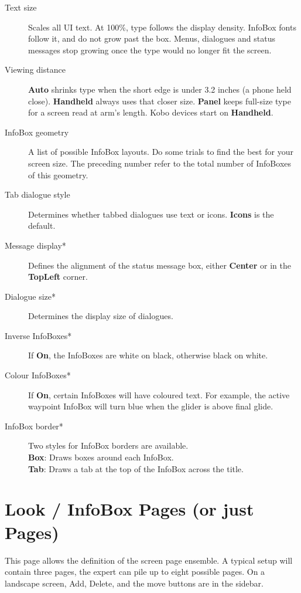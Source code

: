 \begin{description}
\item[Text size]  Scales all UI text. At 100\%, type follows the
  display density. InfoBox fonts follow it, and do not grow past
  the box. Menus, dialogues and status messages stop growing once
  the type would no longer fit the screen.
\item[Viewing distance]  {\bf Auto} shrinks type when the short edge
  is under 3.2 inches (a phone held close). {\bf Handheld} always
  uses that closer size. {\bf Panel} keeps full-size type for a
  screen read at arm's length. Kobo devices start on {\bf Handheld}.
\item[InfoBox geometry]  A list of possible InfoBox layouts. Do some trials to find the 
  best for your screen size. The preceding number refer to the total number of 
  InfoBoxes of this geometry.
\item[Tab dialogue style]  Determines whether tabbed dialogues use text or icons.
  {\bf Icons} is the default.
\item[Message display*]  Defines the alignment of the status message box, either 
  {\bf Center} or in the {\bf TopLeft} corner.
\item[Dialogue size*]  Determines the display size of dialogues.
\item[Inverse InfoBoxes*]  If {\bf On}, the InfoBoxes are white on black, otherwise 
  black on white.
\item[Colour InfoBoxes*]  If {\bf On}, certain InfoBoxes will have coloured text. For 
  example, the active waypoint InfoBox will turn blue when the glider is above final 
  glide.
\item[InfoBox border*]  Two styles for InfoBox borders are available. \\
  {\bf Box}: Draws boxes around each InfoBox. \\
  {\bf Tab}: Draws a tab at the top of the InfoBox across the
  title. \\
\end{description}


\section{Look / InfoBox Pages (or just Pages)}\label{conf:screenpages}

This page allows the definition of the screen page ensemble. A typical setup 
will contain three pages, the expert can pile up to eight possible pages.
On a landscape screen, Add, Delete, and the move buttons are in the
sidebar.

